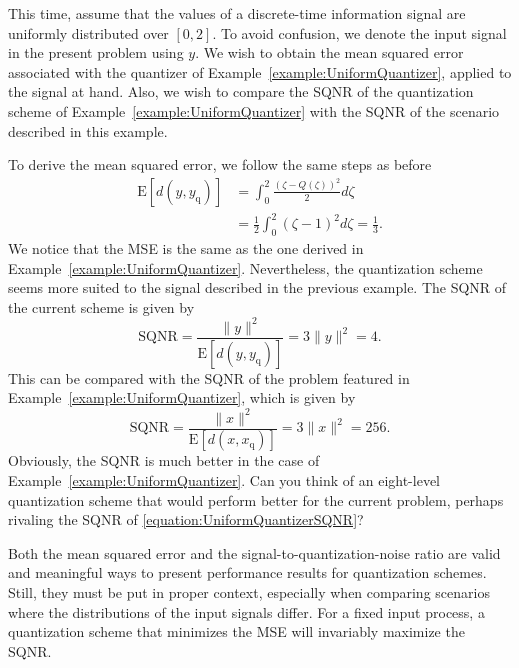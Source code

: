 \begin{example}
This time, assume that the values of a discrete-time information signal are uniformly distributed over $[0,2]$.
To avoid confusion, we denote the input signal in the present problem using $y$.
We wish to obtain the mean squared error associated with the quantizer of Example~\ref{example:UniformQuantizer}, applied to the signal at hand.
Also, we wish to compare the SQNR of the quantization scheme of Example~\ref{example:UniformQuantizer} with the SQNR of the scenario described in this example.

To derive the mean squared error, we follow the same steps as before
\begin{equation*}
\begin{split}
\mathrm{E} [ d(y, y_{\mathrm{q}}) ]
&= \int_0^{2} \frac{(\zeta - Q(\zeta))^2}{2} d\zeta \\
&= \frac{1}{2} \int_{0}^{2} (\zeta - 1)^2 d\zeta = \frac{1}{3} .
\end{split}
\end{equation*}
We notice that the MSE is the same as the one derived in Example~\ref{example:UniformQuantizer}.
Nevertheless, the quantization scheme seems more suited to the signal described in the previous example.
The SQNR of the current scheme is given by
\begin{equation*}
\text{SQNR} = \frac{\| y \|^2}{\mathrm{E} [ d(y, y_{\mathrm{q}}) ]}
= 3 \| y \|^2 = 4.
\end{equation*}
This can be compared with the SQNR of the problem featured in Example~\ref{example:UniformQuantizer}, which is given by
\begin{equation} \label{equation:UniformQuantizerSQNR}
\text{SQNR} = \frac{\| x \|^2}{\mathrm{E} [ d(x, x_{\mathrm{q}}) ]}
= 3 \| x \|^2 = 256.
\end{equation}
Obviously, the SQNR is much better in the case of Example~\ref{example:UniformQuantizer}.
Can you think of an eight-level quantization scheme that would perform better for the current problem, perhaps rivaling the SQNR of \eqref{equation:UniformQuantizerSQNR}?
\end{example}

Both the mean squared error and the signal-to-quantization-noise ratio are valid and meaningful ways to present performance results for quantization schemes.
Still, they must be put in proper context, especially when comparing scenarios where the distributions of the input signals differ.
For a fixed input process, a quantization scheme that minimizes the MSE will invariably maximize the SQNR.


